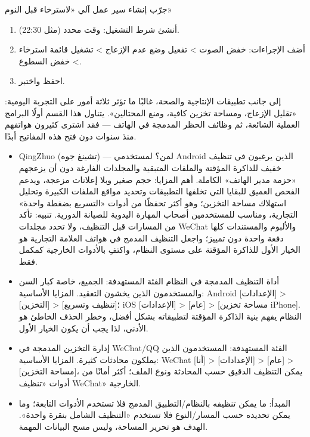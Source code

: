 \begin{tcbpractice}{جرّب إنشاء سير عمل آلي «لاسترخاء قبل النوم»}
\begin{enumerate}
  \item أنشئ شرط التشغيل: وقت محدد (مثل 22:30).
  \item أضف الإجراءات: خفض الصوت > تفعيل وضع عدم الإزعاج > تشغيل قائمة استرخاء > خفض السطوع.
  \item احفظ واختبر.
\end{enumerate}

\end{tcbpractice}


إلى جانب تطبيقات الإنتاجية والصحة، غالبًا ما تؤثر ثلاثة أمور على التجربة اليومية: «تقليل الإزعاج، ومساحة تخزين كافية، ومنع المحتالين». يتناول هذا القسم أولًا البرامج العملية الشائعة، ثم وظائف الحظر المدمجة في الهاتف — فقد اشترى كثيرون هواتفهم منذ سنوات دون فتح هذه المفاتيح أبدًا.


\begin{itemize}
  \item QingZhuo (تشينغ جوه) — لمن؟ لمستخدمي Android الذين يرغبون في تنظيف خفيف للذاكرة المؤقتة والملفات المتبقية والمجلدات الفارغة دون أن يزعجهم «حزمة مدير الهاتف» الكاملة. أهم المزايا: حجم صغير وبلا إعلانات مزعجة، ويدعم الفحص العميق للبقايا التي تخلفها التطبيقات وتحديد مواقع الملفات الكبيرة وتحليل استهلاك مساحة التخزين؛ وهو أكثر تحفظًا من أدوات «التسريع بضغطة واحدة» التجارية، ومناسب للمستخدمين أصحاب المهارة اليدوية للصيانة الدورية. تنبيه: تأكد من المسارات قبل التنظيف، ولا تحدد مجلدات WeChat والألبوم والمستندات كلها دفعة واحدة دون تمييز؛ واجعل التنظيف المدمج في هواتف العلامة التجارية هو الخيار الأول للذاكرة المؤقتة على مستوى النظام، واكتفِ بالأدوات الخارجية كمكمل فقط.
  \item أداة التنظيف المدمجة في النظام الفئة المستهدفة: الجميع، خاصة كبار السن والمستخدمون الذين يخشون التعقيد. المزايا الأساسية: Android [الإعدادات] > [التخزين] > [تنظيف وتسريع]؛ iOS [الإعدادات] > [عام] > [مساحة تخزين iPhone]. النظام يفهم بنية الذاكرة المؤقتة لتطبيقاته بشكل أفضل، وخطر الحذف الخاطئ هو الأدنى، لذا يجب أن يكون الخيار الأول.
  \item إدارة التخزين المدمجة في WeChat/QQ الفئة المستهدفة: المستخدمون الذين يملكون محادثات كثيرة. المزايا الأساسية: WeChat [أنا] > [الإعدادات] > [عام] > [مساحة التخزين]، يمكن التنظيف الدقيق حسب المحادثة ونوع الملف؛ أكثر أمانًا من أدوات «تنظيف WeChat» الخارجية.
  \item المبدأ: ما يمكن تنظيفه بالنظام/التطبيق المدمج فلا تستخدم الأدوات التابعة؛ وما يمكن تحديده حسب المسار/النوع فلا تستخدم «التنظيف الشامل بنقرة واحدة». الهدف هو تحرير المساحة، وليس مسح البيانات المهمة.
\end{itemize}

